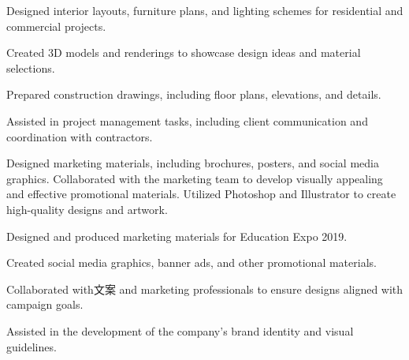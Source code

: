 \begin{tightemize}
\item Designed interior layouts, furniture plans, and lighting schemes for residential and commercial projects.
\item Created 3D models and renderings to showcase design ideas and material selections.
\item Prepared construction drawings, including floor plans, elevations, and details.
\item Assisted in project management tasks, including client communication and coordination with contractors.
\end{tightemize}
\betweenProjectsVSpace
{}
\betweenSummaryPointsVSpace
Designed marketing materials, including brochures, posters, and social media graphics. Collaborated with the marketing team to develop visually appealing and effective promotional materials. Utilized Photoshop and Illustrator to create high-quality designs and artwork.
\begin{tightemize}
\item Designed and produced marketing materials for Education Expo 2019.
\item Created social media graphics, banner ads, and other promotional materials.
\item Collaborated with文案 and marketing professionals to ensure designs aligned with campaign goals.
\item Assisted in the development of the company's brand identity and visual guidelines.
\end{tightemize}